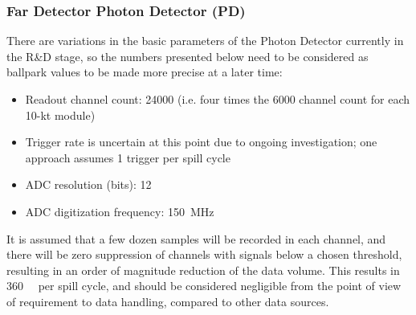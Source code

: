 



\subsubsection{Far Detector Photon Detector (PD)}
There are variations in the basic parameters of the Photon Detector
currently in the R\&D stage, so the numbers presented below need to be
considered as ballpark values to be made more precise at a later time:
\begin{itemize}
\item Readout channel count: \num{24000} (i.e. four times the \num{6000} channel count for each 10-kt module)
\item Trigger rate is uncertain at this point due to ongoing
  investigation; one approach assumes 1 trigger per spill cycle
\item ADC resolution (bits): 12
\item ADC digitization frequency: \SI{150}{\MHz}
\end{itemize}
It is assumed that a few dozen samples will be recorded in each
channel, and there will be zero suppression of channels with signals
below a chosen threshold, resulting in an order of magnitude reduction
of the data volume.  This results in \SI{360}{\kilo\byte} per spill
cycle, and should be considered negligible from the point of view of
requirement to data handling, compared to other data sources.

